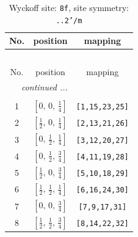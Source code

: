 \documentclass[fleqn,8pt]{jsarticle}
\begin{document}
\begin{longtable}{ccc}
\caption{Wyckoff site: {\tt 8f}, site symmetry: {\tt ..2'/m}}
 \\
 \hline \hline
No. & position & mapping \\ \hline \endfirsthead

\multicolumn{2}{l}{\tablename\ \thetable{}} \\
 \hline \hline
No. & position & mapping \\ \hline \endhead

 \hline \hline
\multicolumn{2}{r}{\footnotesize\it continued ...} \\ \endfoot

 \hline \hline
\multicolumn{2}{r}{} \\ \endlastfoot

1 & $\left[ 0,\, 0,\, \frac{1}{4} \right]$ & {\tt [1,15,23,25]} \\ \hline
2 & $\left[ \frac{1}{2},\, 0,\, \frac{1}{4} \right]$ & {\tt [2,13,21,26]} \\ \hline
3 & $\left[ 0,\, \frac{1}{2},\, \frac{1}{4} \right]$ & {\tt [3,12,20,27]} \\ \hline
4 & $\left[ 0,\, \frac{1}{2},\, \frac{3}{4} \right]$ & {\tt [4,11,19,28]} \\ \hline
5 & $\left[ \frac{1}{2},\, 0,\, \frac{3}{4} \right]$ & {\tt [5,10,18,29]} \\ \hline
6 & $\left[ \frac{1}{2},\, \frac{1}{2},\, \frac{1}{4} \right]$ & {\tt [6,16,24,30]} \\ \hline
7 & $\left[ 0,\, 0,\, \frac{3}{4} \right]$ & {\tt [7,9,17,31]} \\ \hline
8 & $\left[ \frac{1}{2},\, \frac{1}{2},\, \frac{3}{4} \right]$ & {\tt [8,14,22,32]} \\
\end{longtable}
\renewcommand{\arraystretch}{1.2}
\end{document}
